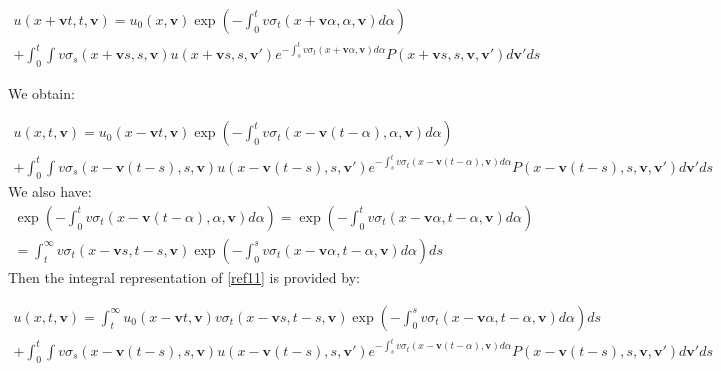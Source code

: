 \documentclass[a4paper, 11pt]{article}
\begin{document}
\begin{multline}
	u(x+\textbf{v}t,t,\textbf{v}) = u_0(x, \textbf{v}) \exp\left(- \int_{0}^{t} v\sigma_t\left(x + \textbf{v} \alpha, \alpha, \textbf{v}\right) d\alpha\right) \\
	+ \int_{0}^{t} \int v\sigma_s\left(x + \textbf{v}s, s, \textbf{v}\right) u\left(x + \textbf{v}s, s, \textbf{v}'\right) e^{- \int_s^t v\sigma_t\left(x + \textbf{v} \alpha, \textbf{v}\right) d\alpha} P\left(x + \textbf{v} s, s, \textbf{v}, \textbf{v}'\right) d\textbf{v}'ds 
\end{multline}

We obtain:

\begin{multline}
	u(x,t,\textbf{v}) = u_0(x - \textbf{v}t, \textbf{v}) \exp\left(- \int_{0}^{t} v\sigma_t\left(x - \textbf{v}(t - \alpha), \alpha, \textbf{v}\right) d\alpha\right) \\
	+ \int_{0}^{t} \int v\sigma_s\left(x - \textbf{v}(t - s), s, \textbf{v}\right) u\left(x - \textbf{v}(t - s), s, \textbf{v}'\right) e^{- \int_s^t v\sigma_t\left(x - \textbf{v}(t - \alpha), \textbf{v}\right) d\alpha} P\left(x - \textbf{v}(t - s), s, \textbf{v}, \textbf{v}'\right) d\textbf{v}'ds \label{ref1}
\end{multline}
We also have:
\begin{multline}
	\exp\left(- \int_{0}^{t} v\sigma_t\left(x - \textbf{v}(t - \alpha), \alpha, \textbf{v}\right) d\alpha\right) = \exp\left(- \int_{0}^{t} v\sigma_t\left(x - \textbf{v} \alpha,t- \alpha, \textbf{v}\right) d\alpha\right) \\ = \int _t^\infty  v\sigma_t\left(x - \textbf{v} s,t- s, \textbf{v}\right)
	\exp\left(- \int_{0}^{s} v\sigma_t\left(x - \textbf{v} \alpha,t- \alpha, \textbf{v}\right) d\alpha\right) ds
\end{multline}
Then the integral representation of \ref{ref11} is provided by:

\begin{multline}
	u(x,t,\textbf{v}) =  \int _t^\infty  u_0(x - \textbf{v}t, \textbf{v}) v\sigma_t\left(x - \textbf{v} s,t- s, \textbf{v}\right)
	\exp\left(- \int_{0}^{s} v\sigma_t\left(x - \textbf{v} \alpha,t- \alpha, \textbf{v}\right) d\alpha\right) ds\\
	+ \int_{0}^{t} \int v\sigma_s\left(x - \textbf{v}(t - s), s, \textbf{v}\right) u\left(x - \textbf{v}(t - s), s, \textbf{v}'\right) e^{- \int_s^t v\sigma_t\left(x - \textbf{v}(t - \alpha), \textbf{v}\right) d\alpha} P\left(x - \textbf{v}(t - s), s, \textbf{v}, \textbf{v}'\right) d\textbf{v}'ds \label{ref13}
\end{multline}
\end{document}
